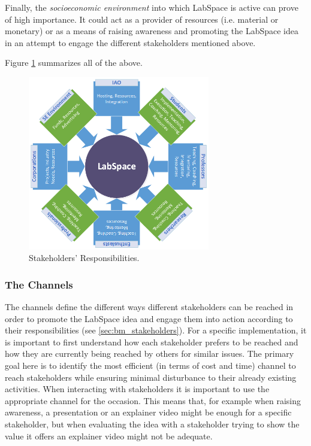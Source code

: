 \documentclass[a4paper, 11pt]{article}
\begin{document}
Finally, the \textit{socioeconomic environment} into which LabSpace is active can prove of high importance. It could act as a provider of resources (i.e. material or monetary) or as a means of raising awareness and promoting the LabSpace idea in an attempt to engage the different stakeholders mentioned above.

Figure \ref{fig:ls_responsibilities} summarizes all of the above.

\begin{figure}[h!]
  \begin{center}
    \includegraphics[width=300px,height=\textheight,keepaspectratio]{imagery/ls_stakeholders.png}
    \caption{Stakeholders' Responsibilities.}
    \label{fig:ls_responsibilities}
  \end{center}
\end{figure}


\subsubsection{The Channels}

The channels define the different ways different stakeholders can be reached in order to promote the LabSpace idea and engage them into action according to their responsibilities (see \ref{sec:bm_stakeholders}). For a specific implementation, it is important to first understand how each stakeholder prefers to be reached and how they are currently being reached by others for similar issues. The primary goal here is to identify the most efficient (in terms of cost and time) channel to reach stakeholders while ensuring minimal disturbance to their already existing activities. When interacting with stakeholders it is important to use the appropriate channel for the occasion. This means that, for example when raising awareness, a presentation or an explainer video might be enough for a specific stakeholder, but when evaluating the idea with a stakeholder trying to show the value it offers an explainer video might not be adequate.
\end{document}
